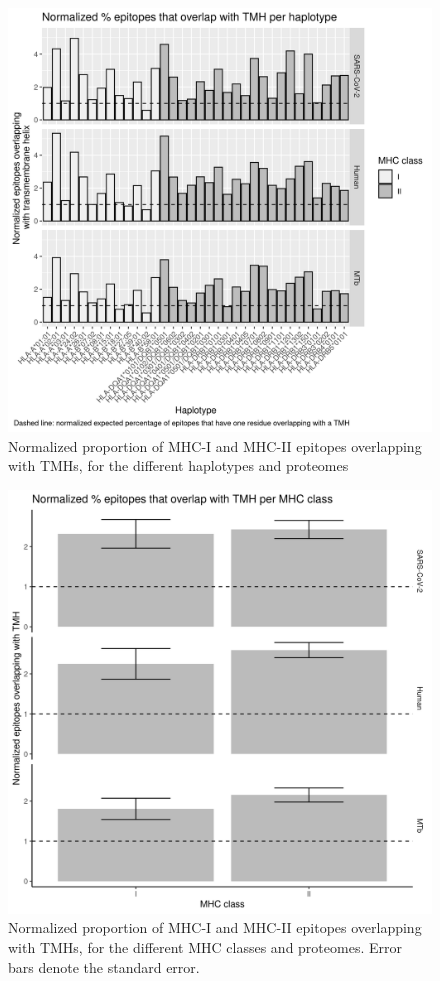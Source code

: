 \begin{figure}[!htbp]
  \includegraphics[width=\textwidth]{bbbq_1_smart_results/fig_rel_presentation_per_haplotype_bw.png}
  \caption{
    Normalized proportion of MHC-I and MHC-II epitopes overlapping with TMHs,
    for the different haplotypes and proteomes
  }
  \label{fig:rel_presentation_per_haplotype}
\end{figure}

\begin{figure}[!htbp]
  \includegraphics[width=\textwidth]{bbbq_1_smart_results/fig_rel_presentation.png}
  \caption{
    Normalized proportion of MHC-I and MHC-II epitopes overlapping with TMHs,
    for the different MHC classes and proteomes. Error bars denote the
    standard error.
  }
  \label{fig:rel_presentation}
\end{figure}

